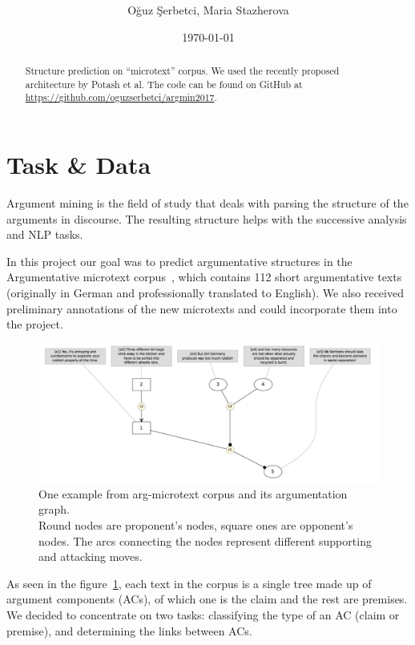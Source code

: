 \documentclass[onecolumn]{article}
\title{\spacecaps{Project module report: Argumentation Mining }\\
       \normalsize\spacesc{University of Potsdam, Winter semester 2017/18}}
\author{Oğuz Şerbetci, Maria Stazherova}
\date{\today}
\begin{document}
\maketitle

\begin{abstract}

Structure prediction on ``microtext'' corpus. We used the recently proposed architecture by Potash et al. The code can be found on GitHub at \url{https://github.com/oguzserbetci/argmin2017}.

\end{abstract}


\section{Task \& Data}
Argument mining is the field of study that deals with parsing the structure of the arguments in discourse. The resulting structure helps with the successive analysis and NLP tasks.

In this project our goal was to predict argumentative structures in the
Argumentative microtext corpus~\cite{peldszus2015annotated}, which contains 112 short argumentative texts
(originally in German and professionally translated to English).
We also received preliminary annotations of the new microtexts
and could incorporate them into the project.

\begin{figure}[h]
    \centering
    \includegraphics[width=0.8\linewidth]{fig/microtext.jpg}
    \caption{One example from arg-microtext corpus and its argumentation graph.
            \\Round nodes are proponent's nodes, square ones are opponent's nodes.
            The arcs connecting the nodes represent different supporting and attacking moves.}\label{fig:microtext}
\end{figure}

As seen in the figure~\ref{fig:microtext}, each text in the corpus is a single tree made up of argument components (ACs), of which one is the claim and the rest are premises.
We decided to concentrate on two tasks: classifying the type of an AC (claim or premise), and determining the links between ACs.
\end{document}

